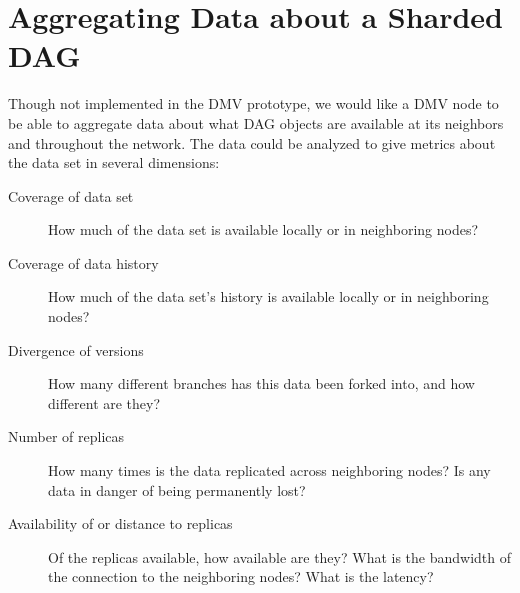 

%


\iffalse
\section{Limitations}

\towrite{non-programmers (and even some programmers) cannot handle Git
    - Key to usability would be to make as linear a history as possible with
        auto-updates, but that is the job of a separate app
    - Cite redesign of Git~\cite{redesign_of_git}
}
\fi

%


\section{Aggregating Data about a Sharded DAG}

Though not implemented in the \gls{DMV} prototype, we would like a \gls{DMV}
node to be able to aggregate data about what \gls{DAG} objects are available at
its neighbors and throughout the network. The data could be analyzed to give
metrics about the data set in several dimensions:

\begin{description}

  \item[Coverage of data set] How much of the data set is available locally or
    in neighboring nodes?

  \item[Coverage of data history] How much of the data set's history is
    available locally or in neighboring nodes?

  \item[Divergence of versions] How many different branches has this data been
    forked into, and how different are they?

  \item[Number of replicas] How many times is the data replicated across
    neighboring nodes? Is any data in danger of being permanently lost?

  \item[Availability of or distance to replicas] Of the replicas available, how
    available are they? What is the bandwidth of the connection to the
    neighboring nodes? What is the latency?

\end{description}

